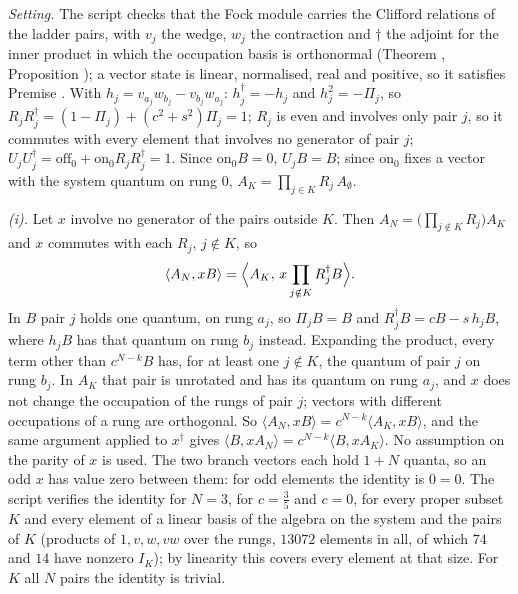 \emph{Setting.} The script checks that the Fock module carries the Clifford relations of the ladder pairs, with $v_{j}$ the wedge, $w_{j}$ the contraction and $\dagger$ the adjoint for the inner product in which the occupation basis is orthonormal (Theorem , Proposition ); a vector state is linear, normalised, real and positive, so it satisfies Premise . With $h_{j} = v_{a_{j}}w_{b_{j}} - v_{b_{j}}w_{a_{j}}$: $h_{j}^{\dagger} = -h_{j}$ and $h_{j}^{2} = -\Pi_{j}$, so $R_{j}R_{j}^{\dagger} = (1 - \Pi_{j}) + (c^{2} + s^{2})\Pi_{j} = 1$; $R_{j}$ is even and involves only pair $j$, so it commutes with every element that involves no generator of pair $j$; $U_{j}U_{j}^{\dagger} = \mathrm{off}_{0} + \mathrm{on}_{0}R_{j}R_{j}^{\dagger} = 1$. Since $\mathrm{on}_{0}B = 0$, $U_{j}B = B$; since $\mathrm{on}_{0}$ fixes a vector with the system quantum on rung $0$, $A_{K} = \prod_{j \in K}R_{j}\,A_{\emptyset}$.

\emph{(i).} Let $x$ involve no generator of the pairs outside $K$. Then $A_{N} = \bigl(\prod_{j \notin K}R_{j}\bigr)A_{K}$ and $x$ commutes with each $R_{j}$, $j \notin K$, so
\[
\langle A_{N}, xB\rangle = \Bigl\langle A_{K},\, x\prod_{j \notin K}R_{j}^{\dagger}B\Bigr\rangle .
\]
In $B$ pair $j$ holds one quantum, on rung $a_{j}$, so $\Pi_{j}B = B$ and $R_{j}^{\dagger}B = cB - s\,h_{j}B$, where $h_{j}B$ has that quantum on rung $b_{j}$ instead. Expanding the product, every term other than $c^{N-k}B$ has, for at least one $j \notin K$, the quantum of pair $j$ on rung $b_{j}$. In $A_{K}$ that pair is unrotated and has its quantum on rung $a_{j}$, and $x$ does not change the occupation of the rungs of pair $j$; vectors with different occupations of a rung are orthogonal. So $\langle A_{N}, xB\rangle = c^{N-k}\langle A_{K}, xB\rangle$, and the same argument applied to $x^{\dagger}$ gives $\langle B, xA_{N}\rangle = c^{N-k}\langle B, xA_{K}\rangle$. No assumption on the parity of $x$ is used. The two branch vectors each hold $1 + N$ quanta, so an odd $x$ has value zero between them: for odd elements the identity is $0 = 0$. The script verifies the identity for $N = 3$, for $c = \tfrac35$ and $c = 0$, for every proper subset $K$ and every element of a linear basis of the algebra on the system and the pairs of $K$ (products of $1, v, w, vw$ over the rungs, $13072$ elements in all, of which $74$ and $14$ have nonzero $I_{K}$); by linearity this covers every element at that size. For $K$ all $N$ pairs the identity is trivial.

